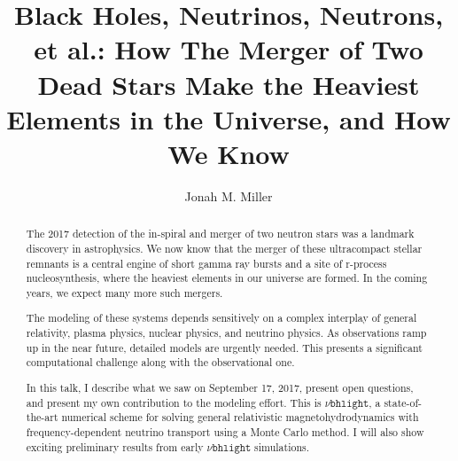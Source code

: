 \documentclass[letter,nofootinbib,superscriptaddress,twocolumn]{revtex4-1}
\newcommand{\nubhlight}{$\nu\texttt{bhlight}$}
\begin{document}
\title{Black Holes, Neutrinos, Neutrons, et al.: How The Merger of Two
  Dead Stars Make the Heaviest Elements in the Universe, and How We
  Know}

\author{Jonah M. Miller}

\begin{abstract}

The 2017 detection of the in-spiral and merger of two neutron stars
was a landmark discovery in astrophysics. We now know that the merger
of these ultracompact stellar remnants is a central engine of short
gamma ray bursts and a site of r-process nucleosynthesis, where the
heaviest elements in our universe are formed. In the coming years, we
expect many more such mergers.

The modeling of these systems depends sensitively on a complex
interplay of general relativity, plasma physics, nuclear physics, and
neutrino physics. As observations ramp up in the near future, detailed
models are urgently needed. This presents a significant computational
challenge along with the observational one.

In this talk, I describe what we saw on September 17, 2017, present
open questions, and present my own contribution to the modeling
effort. This is \nubhlight, a state-of-the-art numerical scheme for
solving general relativistic magnetohydrodynamics with
frequency-dependent neutrino transport using a Monte Carlo method. I
will also show exciting preliminary results from early \nubhlight${}$
simulations.

\end{abstract}

\maketitle
\end{document}
